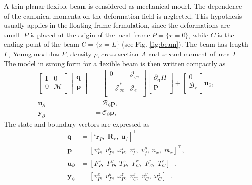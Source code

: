 \documentclass{svjour3}                     %
\begin{document}
A thin planar flexible beam is considered as mechanical model. The dependence of the canonical momenta on the deformation field is neglected. This hypothesis usually applies in the floating frame formulation, since the deformations are small. $P$ is placed at the origin of the local frame $P=\{x=0\}$, while $C$ is the ending point of the beam $C=\{x=L\}$ (see Fig. \ref{fig:beam}). The beam has length $L$, Young modulus $E$, density $\rho$, cross section $A$ and second moment of area $I$. The model in strong form for a flexible beam is then written compactly as 
\begin{equation}
\label{eq:EB_str_phdae}
\begin{aligned}
\begin{bmatrix}
\bm{I} & 0 \\
0 & \bm{\mathcal{M}} \\
\end{bmatrix}
\begin{bmatrix}
\dot{\bm{q}} \\
\dot{\bm{p}} \\
\end{bmatrix}
&= \begin{bmatrix}
0 & \bm{\mathcal{J}}_{qe} \\
-\bm{\mathcal{J}}_{qe}^* & \bm{\mathcal{J}}_e \\
\end{bmatrix}
\begin{bmatrix}
\partial_{\bm{q}} H \\
\bm{p}  \\
\end{bmatrix} + 
\begin{bmatrix}
0 \\
\bm{\mathcal{B}}_r \\
\end{bmatrix} \bm{u}_\partial, \\
\bm{u}_\partial &= \bm{\mathcal{B}}_{\partial} \bm{p}, \\
\bm{y}_\partial &= \bm{\mathcal{C}}_{\partial} \bm{p},
\end{aligned}
\end{equation}
The state and boundary vectors are expressed as
\begin{align*}
\bm{q} &= [^i\bm{r}_P, \; \bm{R}_{\text{v}}, \; \bm{u}_f]^\top \\
\bm{p} &= [v_P^x, \; v_P^y, \; \omega_P^z, \; v_f^x, \; v_f^y, \; n_x, \; m_{x}]^\top, \\
\bm{u}_\partial &=  [F_{P}^x, \; F_{P}^y, \; T_{P}^z, \; F_{C}^x, \; F_{C}^y, \; T_{C}^z]^\top, \\
\bm{y}_\partial &=  [v_{P}^x, \; v_{P}^y, \; \omega_{P}^z, \; v_{C}^x, \; v_{C}^y, \; \omega_{C}^z]^\top.
\end{align*}
\end{document}
